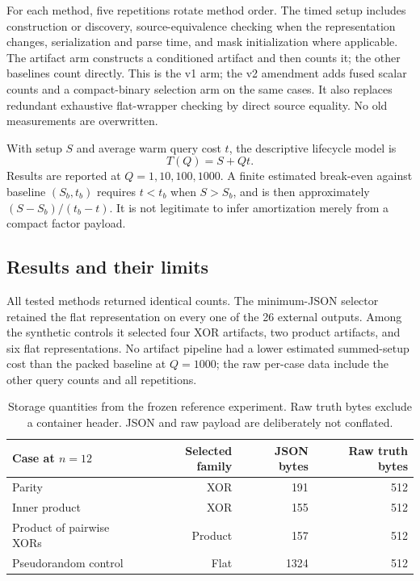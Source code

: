 \documentclass[11pt]{article}
\theoremstyle{definition}\newtheorem{definition}[theorem]{Definition}
\theoremstyle{remark}\newtheorem{remark}[theorem]{Remark}
\begin{document}
For each method, five repetitions rotate method order. The timed setup includes construction or discovery, source-equivalence checking when the representation changes, serialization and parse time, and mask initialization where applicable. The artifact arm constructs a conditioned artifact and then counts it; the other baselines count directly. This is the v1 arm; the v2 amendment adds fused scalar counts and a compact-binary selection arm on the same cases. It also replaces redundant exhaustive flat-wrapper checking by direct source equality. No old measurements are overwritten.

With setup $S$ and average warm query cost $t$, the descriptive lifecycle model is
\begin{equation}
 T(Q)=S+Qt.\label{eq:lifecycle}
\end{equation}
Results are reported at $Q=1,10,100,1000$. A finite estimated break-even against baseline $(S_b,t_b)$ requires $t<t_b$ when $S>S_b$, and is then approximately $(S-S_b)/(t_b-t)$. It is not legitimate to infer amortization merely from a compact factor payload.

\subsection{Results and their limits}
All tested methods returned identical counts. The minimum-JSON selector retained the flat representation on every one of the 26 external outputs. Among the synthetic controls it selected four XOR artifacts, two product artifacts, and six flat representations. No artifact pipeline had a lower estimated summed-setup cost than the packed baseline at $Q=1000$; the raw per-case data include the other query counts and all repetitions.

\begin{table}[ht]
\centering
\begin{tabular}{@{}lrrr@{}}\toprule
Case at $n=12$ & Selected family & JSON bytes & Raw truth bytes\\\midrule
Parity & XOR & 191 & 512\\
Inner product & XOR & 155 & 512\\
Product of pairwise XORs & Product & 157 & 512\\
Pseudorandom control & Flat & 1324 & 512\\\bottomrule
\end{tabular}
\caption{Storage quantities from the frozen reference experiment. Raw truth bytes exclude a container header. JSON and raw payload are deliberately not conflated.}\label{tab:storage}
\end{table}
\end{document}
